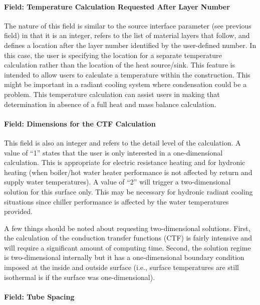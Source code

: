 \paragraph{Field: Temperature Calculation Requested After Layer Number}\label{field-temperature-calculation-requested-after-layer-number}

The nature of this field is similar to the source interface parameter (see previous field) in that it is an integer, refers to the list of material layers that follow, and defines a location after the layer number identified by the user-defined number. In this case, the user is specifying the location for a separate temperature calculation rather than the location of the heat source/sink. This feature is intended to allow users to calculate a temperature within the construction. This might be important in a radiant cooling system where condensation could be a problem. This temperature calculation can assist users in making that determination in absence of a full heat and mass balance calculation.

\paragraph{Field: Dimensions for the CTF Calculation}\label{field-dimensions-for-the-ctf-calculation}

This field is also an integer and refers to the detail level of the calculation. A value of ``1'' states that the user is only interested in a one-dimensional calculation. This is appropriate for electric resistance heating and for hydronic heating (when boiler/hot water heater performance is not affected by return and supply water temperatures). A value of ``2'' will trigger a two-dimensional solution for this surface only. This may be necessary for hydronic radiant cooling situations since chiller performance is affected by the water temperatures provided.

A few things should be noted about requesting two-dimensional solutions. First, the calculation of the conduction transfer functions (CTF) is fairly intensive and will require a significant amount of computing time. Second, the solution regime is two-dimensional internally but it has a one-dimensional boundary condition imposed at the inside and outside surface (i.e., surface temperatures are still isothermal is if the surface was one-dimensional).

\paragraph{Field: Tube Spacing}\label{field-tube-spacing}

